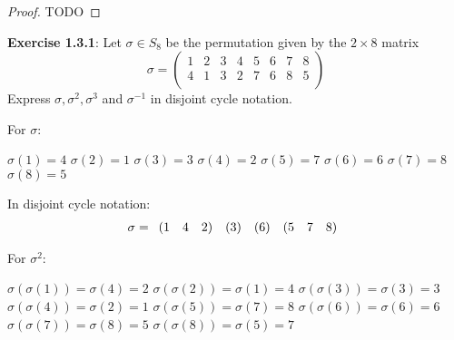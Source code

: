 \documentclass[a4paper]{article}
\begin{document}
\begin{myparindent}{0pt}
\begin{proof}
TODO \newline
\end{proof}

\textbf{Exercise 1.3.1}:
Let $\sigma \in S_8$ be the permutation given by the $2 \times 8$ matrix \newline
\[
  \sigma =
  \begin{pmatrix}
    1 & 2 & 3 & 4 & 5 & 6 & 7 & 8 \\
    4 & 1 & 3 & 2 & 7 & 6 & 8 & 5 \\
  \end{pmatrix}
\]
Express $\sigma, \sigma^2, \sigma^3$ and $\sigma^{-1}$ in disjoint cycle notation. \newline

For $\sigma$:

$\sigma(1) = 4$ \newline
$\sigma(2) = 1$ \newline
$\sigma(3) = 3$ \newline
$\sigma(4) = 2$ \newline
$\sigma(5) = 7$ \newline
$\sigma(6) = 6$ \newline
$\sigma(7) = 8$ \newline
$\sigma(8) = 5$ \newline

In disjoint cycle notation:
\[
    \noindent \sigma = \begin{array}{rrr} (1 & 4 & 2) \end{array}
    \noindent \begin{array}{r} (3) \end{array}
    \noindent \begin{array}{r} (6) \end{array}
    \noindent \begin{array}{rrr} (5 & 7 & 8) \end{array}
\]

For $\sigma^2$:

$\sigma(\sigma(1)) = \sigma(4) = 2$ \newline
$\sigma(\sigma(2)) = \sigma(1) = 4$ \newline
$\sigma(\sigma(3)) = \sigma(3) = 3$ \newline
$\sigma(\sigma(4)) = \sigma(2) = 1$ \newline
$\sigma(\sigma(5)) = \sigma(7) = 8$ \newline
$\sigma(\sigma(6)) = \sigma(6) = 6$ \newline
$\sigma(\sigma(7)) = \sigma(8) = 5$ \newline
$\sigma(\sigma(8)) = \sigma(5) = 7$ \newline


\end{myparindent}
\end{document}

